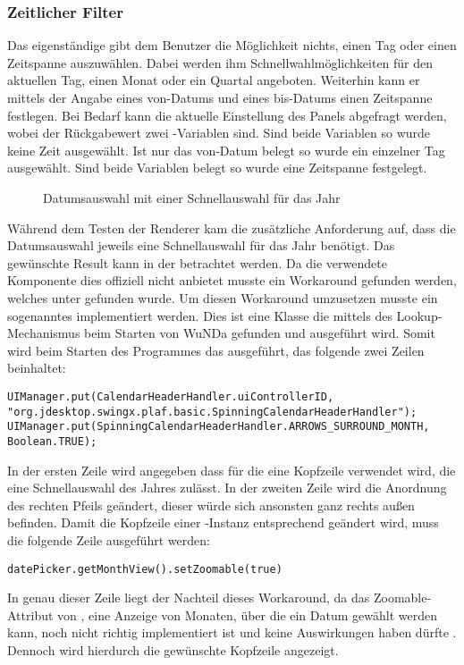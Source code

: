 \subsubsection{Zeitlicher Filter}
Das eigenständige   gibt dem Benutzer die Möglichkeit nichts, einen Tag oder einen Zeitspanne auszuwählen.
Dabei werden ihm Schnellwahlmöglichkeiten für den aktuellen Tag, einen Monat oder ein Quartal angeboten.
Weiterhin kann er mittels der Angabe eines von-Datums und eines bis-Datums einen Zeitspanne festlegen.
Bei Bedarf kann die aktuelle Einstellung des Panels abgefragt werden, wobei der Rückgabewert zwei -Variablen sind.
Sind beide Variablen  so wurde keine Zeit ausgewählt.
Ist nur das von-Datum belegt so wurde ein einzelner Tag ausgewählt.
Sind beide Variablen belegt so wurde eine Zeitspanne festgelegt.

\begin{figure}[htb]
	\centering
	\caption{Datumsauswahl mit einer Schnellauswahl für das Jahr}
	\label{fig:jxdatepicker}
\end{figure}

Während dem Testen der Renderer kam die zusätzliche Anforderung auf, dass die Datumsauswahl jeweils eine Schnellauswahl für das Jahr benötigt.
Das gewünschte Result kann in der  betrachtet werden.
Da die verwendete Komponente  dies offiziell nicht anbietet musste ein Workaround gefunden werden, welches unter \autocite{so-jxdatepicker} gefunden wurde.
Um diesen Workaround umzusetzen musste ein sogenanntes  implementiert werden. 
Dies ist eine Klasse die mittels des Lookup-Mechanismus beim Starten von \ac{WuNDa} gefunden und ausgeführt wird.
Somit wird beim Starten des Programmes das   ausgeführt, das folgende zwei Zeilen beinhaltet:
\begin{lstlisting}
UIManager.put(CalendarHeaderHandler.uiControllerID, "org.jdesktop.swingx.plaf.basic.SpinningCalendarHeaderHandler");
UIManager.put(SpinningCalendarHeaderHandler.ARROWS_SURROUND_MONTH, Boolean.TRUE);
\end{lstlisting}
In der ersten Zeile wird angegeben dass für die  eine Kopfzeile verwendet wird, die eine Schnellauswahl des Jahres zulässt.
In der zweiten Zeile wird die Anordnung des rechten Pfeils geändert, dieser würde sich ansonsten ganz rechts außen befinden.
Damit die Kopfzeile einer -Instanz  entsprechend geändert wird, muss die folgende Zeile ausgeführt werden:
\begin{lstlisting}
datePicker.getMonthView().setZoomable(true)
\end{lstlisting}
In genau dieser Zeile liegt der Nachteil dieses Workaround, da das Zoomable-Attribut von , eine Anzeige von Monaten, über die ein Datum gewählt werden kann, noch nicht richtig implementiert ist und keine Auswirkungen haben dürfte \autocite[vgl.][]{swingx-jxdatepicker}.
Dennoch wird hierdurch die gewünschte Kopfzeile angezeigt.

